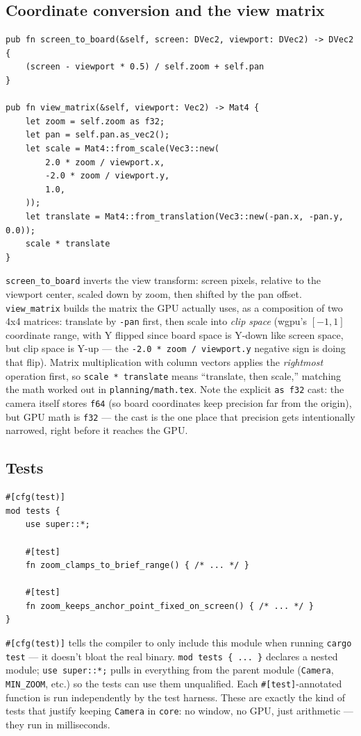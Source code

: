 \documentclass[11pt]{article}
\begin{document}
\subsection{Coordinate conversion and the view matrix}
\begin{lstlisting}
pub fn screen_to_board(&self, screen: DVec2, viewport: DVec2) -> DVec2 {
    (screen - viewport * 0.5) / self.zoom + self.pan
}

pub fn view_matrix(&self, viewport: Vec2) -> Mat4 {
    let zoom = self.zoom as f32;
    let pan = self.pan.as_vec2();
    let scale = Mat4::from_scale(Vec3::new(
        2.0 * zoom / viewport.x,
        -2.0 * zoom / viewport.y,
        1.0,
    ));
    let translate = Mat4::from_translation(Vec3::new(-pan.x, -pan.y, 0.0));
    scale * translate
}
\end{lstlisting}
\texttt{screen\_to\_board} inverts the view transform: screen pixels, relative to the
viewport center, scaled down by zoom, then shifted by the pan offset. \texttt{view\_matrix}
builds the matrix the GPU actually uses, as a composition of two 4x4 matrices: translate by
\texttt{-pan} first, then scale into \emph{clip space} (wgpu's $[-1, 1]$ coordinate range,
with Y flipped since board space is Y-down like screen space, but clip space is Y-up — the
\texttt{-2.0 * zoom / viewport.y} negative sign is doing that flip). Matrix multiplication
with column vectors applies the \emph{rightmost} operation first, so \texttt{scale *
translate} means ``translate, then scale,'' matching the math worked out in
\texttt{planning/math.tex}. Note the explicit \texttt{as f32} cast: the camera itself
stores \texttt{f64} (so board coordinates keep precision far from the origin), but GPU math
is \texttt{f32} — the cast is the one place that precision gets intentionally narrowed, right
before it reaches the GPU.

\subsection{Tests}
\label{sec:testing}
\begin{lstlisting}
#[cfg(test)]
mod tests {
    use super::*;

    #[test]
    fn zoom_clamps_to_brief_range() { /* ... */ }

    #[test]
    fn zoom_keeps_anchor_point_fixed_on_screen() { /* ... */ }
}
\end{lstlisting}
\texttt{\#[cfg(test)]} tells the compiler to only include this module when running
\texttt{cargo test} — it doesn't bloat the real binary. \texttt{mod tests \{ ... \}}
declares a nested module; \texttt{use super::*;} pulls in everything from the parent module
(\texttt{Camera}, \texttt{MIN\_ZOOM}, etc.) so the tests can use them unqualified. Each
\texttt{\#[test]}-annotated function is run independently by the test harness. These are
exactly the kind of tests that justify keeping \texttt{Camera} in \texttt{core}: no window,
no GPU, just arithmetic — they run in milliseconds.
\end{document}
